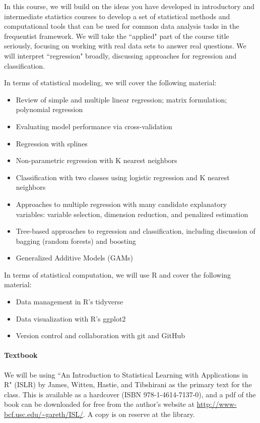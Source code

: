 \documentclass[11pt]{article}
\begin{document}
In this course, we will build on the ideas you have developed in introductory and intermediate statistics courses to develop a set of statistical methods and computational tools that can be used for common data analysis tasks in the frequentist framework.  We will take the ``applied" part of the course title seriously, focusing on working with real data sets to answer real questions.  We will interpret ``regression" broadly, discussing approaches for regression and classification.

In terms of statistical modeling, we will cover the following material:
\begin{itemize}
  \item Review of simple and multiple linear regression; matrix formulation; polynomial regression
  \item Evaluating model performance via cross-validation
  \item Regression with splines
  \item Non-parametric regression with K nearest neighbors
  \item Classification with two classes using logistic regression and K nearest neighbors
  \item Approaches to multiple regression with many candidate explanatory variables: variable selection, dimension reduction, and penalized estimation
  \item Tree-based approaches to regression and classification, including discussion of bagging (random forests) and boosting
  \item Generalized Additive Models (GAMs)
\end{itemize}

In terms of statistical computation, we will use R and cover the following material:
\begin{itemize}
  \item Data management in R's tidyverse
  \item Data visualization with R's ggplot2
  \item Version control and collaboration with git and GitHub
\end{itemize}

\paragraph{Textbook}

We will be using ``An Introduction to Statistical Learning with Applications in R" (ISLR) by James, Witten, Hastie, and Tibshirani as the primary text for the class.  This is available as a hardcover (ISBN 978-1-4614-7137-0), and a pdf of the book can be downloaded for free from the author's website at \url{http://www-bcf.usc.edu/~gareth/ISL/}.
A copy is on reserve at the library.
\end{document}
